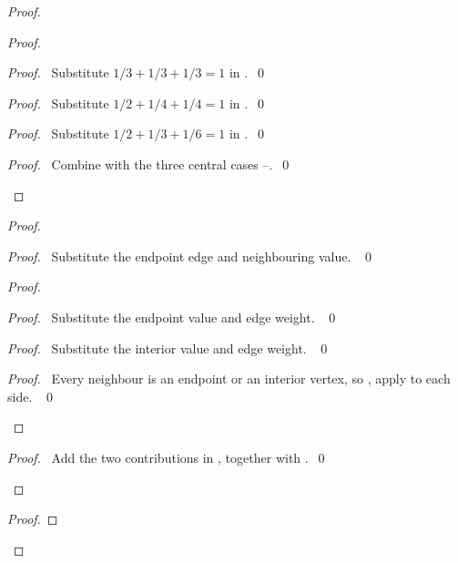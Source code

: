 \begin{proof}
\begin{proof}
\begin{proof}\pf\ Substitute $1/3+1/3+1/3=1$ in
.~\qed\end{proof}
\begin{proof}\pf\ Substitute $1/2+1/4+1/4=1$ in .~\qed\end{proof}
\begin{proof}\pf\ Substitute $1/2+1/3+1/6=1$ in .~\qed\end{proof}
\qedstep
\begin{proof}\pf\ Combine  with the three central
cases --.~\qed\end{proof}
\end{proof}
\begin{proof}
\begin{proof}\pf\ Substitute the endpoint edge and neighbouring value. ~\qed\end{proof}
\begin{proof}
\begin{proof}\pf\ Substitute the endpoint value and edge weight. ~\qed\end{proof}
\begin{proof}\pf\ Substitute the interior value and edge weight. ~\qed\end{proof}
\qedstep
\begin{proof}\pf\ Every neighbour is an endpoint or an interior vertex,
so ,  apply to each side. ~\qed\end{proof}
\end{proof}
\qedstep
\begin{proof}\pf\ Add the two contributions in
, together with .~\qed\end{proof}
\end{proof}
\begin{proof}

\end{proof}
\end{proof}

